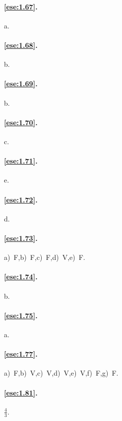 \paragraph{\ref{ese:1.67}.}
a.

\paragraph{\ref{ese:1.68}.}
b.

\paragraph{\ref{ese:1.69}.}
b.

\paragraph{\ref{ese:1.70}.}
c.

\paragraph{\ref{ese:1.71}.}
e.

\paragraph{\ref{ese:1.72}.}
d.

\paragraph{\ref{ese:1.73}.}
a)~F,\quad b)~F,\quad c)~F,\quad d)~V,\quad e)~F.

\paragraph{\ref{ese:1.74}.}
b.

\paragraph{\ref{ese:1.75}.}
a.

\paragraph{\ref{ese:1.77}.}
a)~F,\quad b)~V,\quad c)~V,\quad d)~V,\quad e)~V,\quad f)~F,\quad g)~F.

\paragraph{\ref{ese:1.81}.}
$\frac{4}{3}$.

